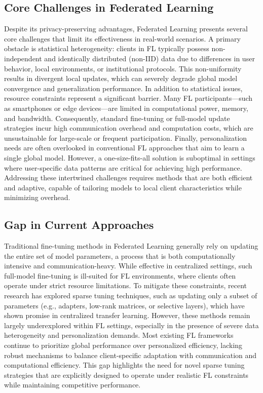 \documentclass[10pt,twocolumn,letterpaper]{article}
\begin{document}
\subsection{Core Challenges in Federated Learning}
Despite its privacy-preserving advantages, Federated Learning presents several core challenges that limit its effectiveness in real-world scenarios. A primary obstacle is statistical heterogeneity: clients in FL typically possess non-independent and identically distributed (non-IID) data due to differences in user behavior, local environments, or institutional protocols. This non-uniformity results in divergent local updates, which can severely degrade global model convergence and generalization performance. In addition to statistical issues, resource constraints represent a significant barrier. Many FL participants—such as smartphones or edge devices—are limited in computational power, memory, and bandwidth. Consequently, standard fine-tuning or full-model update strategies incur high communication overhead and computation costs, which are unsustainable for large-scale or frequent participation. Finally, personalization needs are often overlooked in conventional FL approaches that aim to learn a single global model. However, a one-size-fits-all solution is suboptimal in settings where user-specific data patterns are critical for achieving high performance. Addressing these intertwined challenges requires methods that are both efficient and adaptive, capable of tailoring models to local client characteristics while minimizing overhead.   

\subsection{Gap in Current Approaches}
Traditional fine-tuning methods in Federated Learning generally rely on updating the entire set of model parameters, a process that is both computationally intensive and communication-heavy. While effective in centralized settings, such full-model fine-tuning is ill-suited for FL environments, where clients often operate under strict resource limitations. To mitigate these constraints, recent research has explored sparse tuning techniques, such as updating only a subset of parameters (e.g., adapters, low-rank matrices, or selective layers), which have shown promise in centralized transfer learning. However, these methods remain largely underexplored within FL settings, especially in the presence of severe data heterogeneity and personalization demands. Most existing FL frameworks continue to prioritize global performance over personalized efficiency, lacking robust mechanisms to balance client-specific adaptation with communication and computational efficiency. This gap highlights the need for novel sparse tuning strategies that are explicitly designed to operate under realistic FL constraints while maintaining competitive performance.
\end{document}
